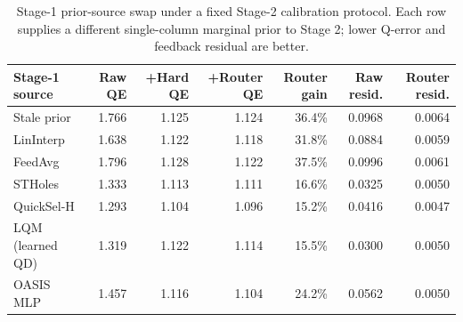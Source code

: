 \begin{table}[t]
  \centering
  \small
  \caption{Stage-1 prior-source swap under a fixed Stage-2 calibration protocol. Each row supplies a different single-column marginal prior to Stage 2; lower Q-error and feedback residual are better.}
  \label{tab:stage1_estimator_swap}
  \setlength{\tabcolsep}{4pt}
  \begin{tabular}{lrrrrrr}
    \toprule
    Stage-1 source & Raw QE & +Hard QE & +Router QE & Router gain & Raw resid. & Router resid. \\
    \midrule
    Stale prior & 1.766 & 1.125 & 1.124 & 36.4\% & 0.0968 & 0.0064 \\
    LinInterp & 1.638 & 1.122 & 1.118 & 31.8\% & 0.0884 & 0.0059 \\
    FeedAvg & 1.796 & 1.128 & 1.122 & 37.5\% & 0.0996 & 0.0061 \\
    STHoles & 1.333 & 1.113 & 1.111 & 16.6\% & 0.0325 & 0.0050 \\
    QuickSel-H & 1.293 & 1.104 & 1.096 & 15.2\% & 0.0416 & 0.0047 \\
    LQM (learned QD) & 1.319 & 1.122 & 1.114 & 15.5\% & 0.0300 & 0.0050 \\
    OASIS MLP & 1.457 & 1.116 & 1.104 & 24.2\% & 0.0562 & 0.0050 \\
    \bottomrule
  \end{tabular}
\end{table}
